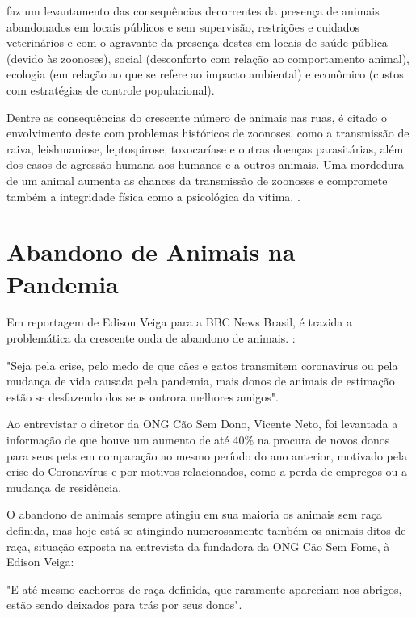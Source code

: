 \cite{Alvez} faz um levantamento das consequências decorrentes da presença de animais abandonados em locais públicos e sem supervisão, restrições e cuidados veterinários e com o agravante da presença destes em locais de saúde pública (devido às zoonoses), social (desconforto com relação ao comportamento animal), ecologia (em relação ao que se refere ao impacto ambiental) e econômico (custos com estratégias de controle populacional). 

Dentre as consequências do crescente número de animais nas ruas, é citado o envolvimento deste com problemas históricos de zoonoses, como a transmissão de raiva, leishmaniose, leptospirose, toxocaríase e outras doenças parasitárias, além dos casos de agressão humana aos humanos e a outros animais. Uma mordedura de um animal aumenta as chances da transmissão de zoonoses e compromete também a integridade física como a psicológica da vítima. \cite{Alvez}.

\newpage

\section{Abandono de Animais na Pandemia}
\label{sec:AbandonoAnimaiPandemia}
Em reportagem de Edison Veiga para a BBC News Brasil, é trazida a problemática da crescente onda de abandono de animais. \cite{Veiga}:

\begin{citacao}
"Seja pela crise, pelo medo de que cães e gatos transmitem coronavírus ou pela mudança de vida causada pela pandemia, mais donos de animais de estimação estão se desfazendo dos seus outrora melhores amigos".
\end{citacao}

Ao entrevistar o diretor da ONG Cão Sem Dono, Vicente Neto, foi levantada a informação de que houve um aumento de até 40\% na procura de novos donos para seus pets em comparação ao mesmo período do ano anterior, motivado pela crise do Coronavírus e por motivos relacionados, como a perda de empregos ou a mudança de residência.

O abandono de animais sempre atingiu em sua maioria os animais sem raça definida, mas hoje está se atingindo numerosamente também os animais ditos de raça, situação exposta na entrevista da fundadora da ONG Cão Sem Fome,  à Edison Veiga:

\begin{citacao}
"E até mesmo cachorros de raça definida, que raramente apareciam nos abrigos, estão sendo deixados para trás por seus donos"\cite{Lombardi}.
\end{citacao}


